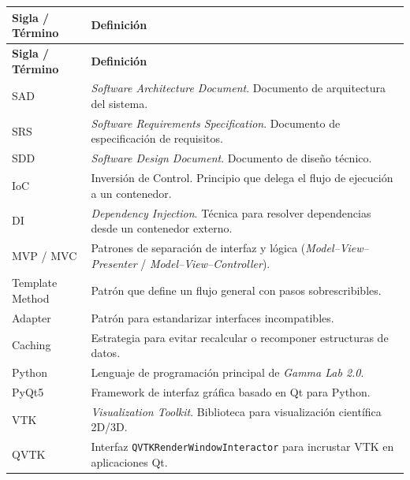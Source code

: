 \documentclass{article}
\begin{document}
\begin{longtable}{|p{3.5cm}|p{10.5cm}|}


\hline
\textbf{Sigla / Término} & \textbf{Definición} \\
\hline
\endfirsthead

\hline
\textbf{Sigla / Término} & \textbf{Definición} \\
\hline
\endhead

SAD & \textit{Software Architecture Document}. Documento de arquitectura del sistema. \\
\hline

SRS & \textit{Software Requirements Specification}. Documento de especificación de requisitos. \\
\hline

SDD & \textit{Software Design Document}. Documento de diseño técnico. \\
\hline

IoC & Inversión de Control. Principio que delega el flujo de ejecución a un contenedor. \\
\hline

DI & \textit{Dependency Injection}. Técnica para resolver dependencias desde un contenedor externo. \\
\hline

MVP / MVC & Patrones de separación de interfaz y lógica (\textit{Model--View--Presenter} / \textit{Model--View--Controller}). \\
\hline

Template Method & Patrón que define un flujo general con pasos sobrescribibles. \\
\hline

Adapter & Patrón para estandarizar interfaces incompatibles. \\
\hline

Caching & Estrategia para evitar recalcular o recomponer estructuras de datos. \\
\hline

Python & Lenguaje de programación principal de \textit{Gamma Lab 2.0}. \\
\hline

PyQt5 & Framework de interfaz gráfica basado en Qt para Python. \\
\hline

VTK & \textit{Visualization Toolkit}. Biblioteca para visualización científica 2D/3D. \\
\hline

QVTK & Interfaz \texttt{QVTKRenderWindowInteractor} para incrustar VTK en aplicaciones Qt. \\
\hline


\end{longtable}
\end{document}
